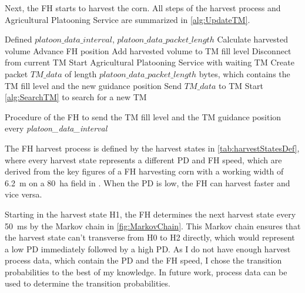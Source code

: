 Next, the \ac{FH} starts to harvest the corn.
All steps of the harvest process and Agricultural Platooning Service are summarized in
\autoref{alg:UpdateTM}.

\begin{algorithm}
\begin{algorithmic}[1]
\REQUIRE Defined $platoon\_data\_interval$, $platoon\_data\_packet\_length$
\STATE Calculate harvested volume
\STATE Advance \ac{FH} position
\STATE Add harvested volume to \ac{TM} fill level
    \STATE Disconnect from current \ac{TM}
	\STATE Start Agricultural Platooning Service with waiting \ac{TM}
\ELSE
	\STATE Create packet $TM\_data$ of length $platoon\_data\_packet\_length$ bytes, which contains the \ac{TM} fill level and the new guidance position
	\STATE Send $TM\_data$ to \ac{TM}
		\STATE Start \autoref{alg:SearchTM} to search for a new \ac{TM}
	\ENDIF
\ENDIF
\end{algorithmic}
\caption{Procedure of the \acf{FH} to send the \acf{TM} fill level and the \ac{TM} guidance position every
\textit{platoon\_data\_interval}}
\label{alg:UpdateTM}
\end{algorithm}

The FH harvest process is defined by the harvest states in \autoref{tab:harvestStatesDef},
where every harvest state represents a different \ac{PD} and \ac{FH} speed, which are derived from the key figures of a
\ac{FH} harvesting corn with a working width of \SI{6.2}{\meter} on a \SI{80}{\hectare} field in \cite{faustzahlen2018}.
When the \ac{PD} is low, the \ac{FH} can harvest faster and vice versa.

Starting in the harvest state H1, the \ac{FH} determines the next harvest state every \SI{50}{\milli\second}
by the Markov chain in \autoref{fig:MarkovChain}.
This Markov chain ensures that the harvest state can't transverse from H0 to H2 directly, which would represent
a low \ac{PD} immediately followed by a high \ac{PD}.
As I do not have enough harvest process data, which contain the \ac{PD} and the \ac{FH} speed,
I chose the transition probabilities to the best of my knowledge.
In future work, process data can be used to determine
the transition probabilities.

